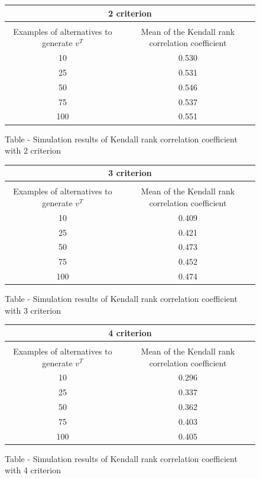 \documentclass{report}
\begin{document}
\begin{figure}[H] 
\begin{center}
\begin{tabular}{ |c||c| }
 \hline
 \multicolumn{2}{|c|}{2 criterion} \\
 \hline
\\[-1em] Examples of alternatives to generate $v^T$& Mean of the Kendall rank correlation coefficient\\
 \hline
 10   & 0.530\\
 25   & 0.531\\
 50   & 0.546\\
 75   & 0.537\\
 100 & 0.551\\
 \hline
\end{tabular}
\end{center}
\caption{Table - Simulation results of Kendall rank correlation coefficient with 2 criterion}
\end{figure}

\begin{figure}[H] 
\begin{center}
\begin{tabular}{ |c||c| }
 \hline
 \multicolumn{2}{|c|}{3 criterion} \\
 \hline
\\[-1em] Examples of alternatives to generate $v^T$& Mean of the Kendall rank correlation coefficient\\
 \hline
 10   & 0.409 \\
 25   & 0.421 \\
 50   & 0.473 \\
 75   & 0.452 \\
 100 & 0.474  \\
 \hline
\end{tabular}
\end{center}
\caption{Table - Simulation results of Kendall rank correlation coefficient with 3 criterion}
\end{figure}

\begin{figure}[H] 
\begin{center}
\begin{tabular}{ |c||c| }
 \hline
 \multicolumn{2}{|c|}{4 criterion} \\
 \hline
\\[-1em] Examples of alternatives to generate $v^T$& Mean of the Kendall rank correlation coefficient\\
 \hline
 10   & 0.296 \\
 25   & 0.337 \\
 50   & 0.362 \\
 75   & 0.403 \\
 100 & 0.405 \\
 \hline
\end{tabular}
\end{center}
\caption{Table - Simulation results of Kendall rank correlation coefficient with 4 criterion}
\end{figure}
\end{document}
